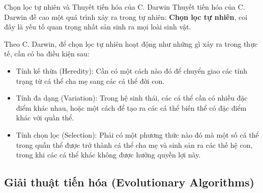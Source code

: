 \begin{frame}{Chọn lọc tự nhiên và Thuyết tiến hóa của C. Darwin}
Thuyết tiến hóa của C. Darwin đề cao một quá trình xảy ra trong tự nhiên:
\textbf{Chọn lọc tự nhiên}, coi đây là yếu tố quan trọng nhất sản sinh ra mọi
loài sinh vật.

Theo C. Darwin, để chọn lọc tự nhiên hoạt động như những gì xảy ra trong thực tế,
cần có ba điều kiện sau:

\begin{itemize}
\item Tính kế thừa (Heredity): Cần có một cách nào đó để chuyển giao các tính
  trạng từ cá thể cha mẹ sang các cá thể đời con.
\item Tính đa dạng (Variation): Trong hệ sinh thái, các cá thể cần có nhiều đặc
  điểm khác nhau, hoặc một cách để tạo ra các cá thể biến thể có đặc điểm khác
  với quần thể.
\item Tính chọn lọc (Selection): Phải có một phương thức nào đó mà một số cá thể
  trong quần thể được trở thành cá thể cha mẹ và sinh sản ra các thế hệ
  con, trong khi các cá thể khác không được hưởng quyền lợi này.
\end{itemize}
\end{frame}


\subsection{Giải thuật tiến hóa (Evolutionary Algorithms)} %
\label{sub:Giải thuật tiến hóa (Evolutionary Algorithms)}

